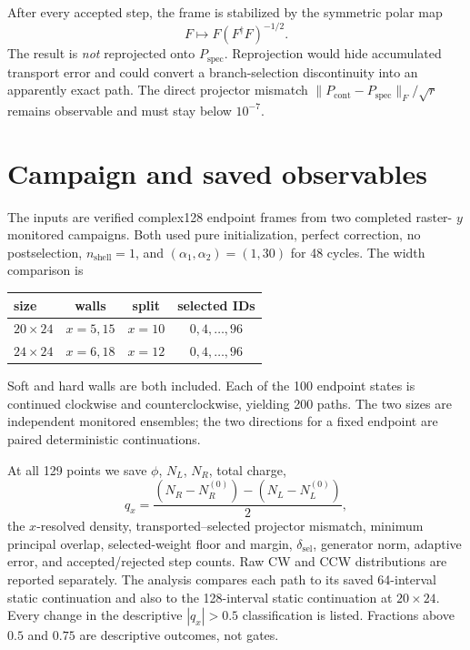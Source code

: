 \documentclass[aps,prb,twocolumn,floatfix,nofootinbib,superscriptaddress]{revtex4-2}
\begin{document}
After every accepted step, the frame is stabilized by the symmetric polar
map
\begin{equation}
  F\longmapsto F(F^\dagger F)^{-1/2}.
  \label{eq:polar}
\end{equation}
The result is \emph{not} reprojected onto $P_{\mathrm{spec}}$.  Reprojection
would hide accumulated transport error and could convert a branch-selection
discontinuity into an apparently exact path.  The direct projector mismatch
$\|P_{\mathrm{cont}}-P_{\mathrm{spec}}\|_F/\sqrt r$ remains observable and
must stay below $10^{-7}$.

\section{Campaign and saved observables}

The inputs are verified complex128 endpoint frames from two completed raster-
$y$ monitored campaigns.  Both used pure initialization, perfect correction,
no postselection, $n_{\mathrm{shell}}=1$, and
$(\alpha_1,\alpha_2)=(1,30)$ for 48 cycles.  The width comparison is
\begin{center}
\begin{tabular}{lccc}
\toprule
size & walls & split & selected IDs\\
\midrule
$20\times24$ & $x=5,15$ & $x=10$ & $0,4,\ldots,96$\\
$24\times24$ & $x=6,18$ & $x=12$ & $0,4,\ldots,96$\\
\bottomrule
\end{tabular}
\end{center}
Soft and hard walls are both included.  Each of the 100 endpoint states is
continued clockwise and counterclockwise, yielding 200 paths.  The two sizes
are independent monitored ensembles; the two directions for a fixed endpoint
are paired deterministic continuations.

At all 129 points we save $\phi$, $N_L$, $N_R$, total charge,
\begin{equation}
  q_x=\frac{(N_R-N_R^{(0)})-(N_L-N_L^{(0)})}{2},
\end{equation}
the $x$-resolved density, transported--selected projector mismatch, minimum
principal overlap, selected-weight floor and margin, $\delta_{\mathrm{sel}}$,
generator norm, adaptive error, and accepted/rejected step counts.  Raw CW
and CCW distributions are reported separately.  The analysis compares each
path to its saved 64-interval static continuation and also to the 128-interval
static continuation at $20\times24$.  Every change in the descriptive
$|q_x|>0.5$ classification is listed.  Fractions above $0.5$ and $0.75$ are
descriptive outcomes, not gates.
\end{document}
